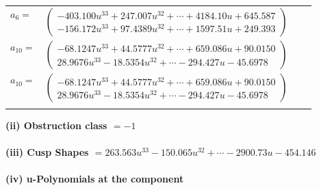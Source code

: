 \documentclass[1p]{elsarticle_modified}
\theoremstyle{definition}
\begin{document}
\begin{tabular}{m{7pt} m{180pt} m{7pt} m{180pt} }
\flushright $a_{6}=$&$\begin{pmatrix}-403.100 u^{33}+247.007 u^{32}+\cdots+4184.10 u+645.587\\-156.172 u^{33}+97.4389 u^{32}+\cdots+1597.51 u+249.393\end{pmatrix}$ \\
\flushright $a_{10}=$&$\begin{pmatrix}-68.1247 u^{33}+44.5777 u^{32}+\cdots+659.086 u+90.0150\\28.9676 u^{33}-18.5354 u^{32}+\cdots-294.427 u-45.6978\end{pmatrix}$\\ \flushright $a_{10}=$&$\begin{pmatrix}-68.1247 u^{33}+44.5777 u^{32}+\cdots+659.086 u+90.0150\\28.9676 u^{33}-18.5354 u^{32}+\cdots-294.427 u-45.6978\end{pmatrix}$\\&\end{tabular}
\flushleft \textbf{(ii) Obstruction class $= -1$}\\~\\
\flushleft \textbf{(iii) Cusp Shapes $= 263.563 u^{33}-150.065 u^{32}+\cdots-2900.73 u-454.146$}\\~\\
\newpage\renewcommand{\arraystretch}{1}
\flushleft \textbf{(iv) u-Polynomials at the component}\newline \\
\end{document}
